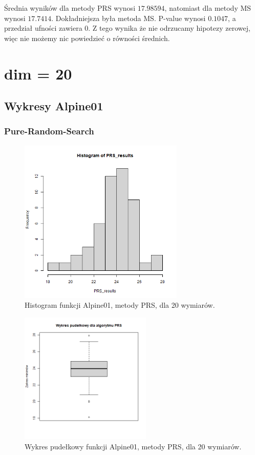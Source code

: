 \documentclass{lab}
\begin{document}
Średnia wyników dla metody PRS wynosi $17.98594$, natomiast dla metody MS wynosi $17.7414$. Dokładniejsza była metoda MS. P-value wynosi $0.1047$, a przedział ufności zawiera 0. Z tego wynika że nie odrzucamy hipotezy zerowej, więc nie możemy nic powiedzieć o równości średnich.

\section{dim = 20}
\subsection{Wykresy Alpine01}
\subsubsection{Pure-Random-Search}
\begin{figure}[H]
  \centering
  \includegraphics[width=0.7\textwidth]{img/dim20_PRS_Alpine01_his.png}
  \caption{Histogram funkcji Alpine01, metody PRS, dla 20 wymiarów.}
\end{figure}
\begin{figure}[H]
  \centering
  \includegraphics[width=0.56\textwidth]{img/dim20_PRS_Alpine01.png}
  \caption{Wykres pudełkowy funkcji Alpine01, metody PRS, dla 20 wymiarów.}
\end{figure}
\end{document}

